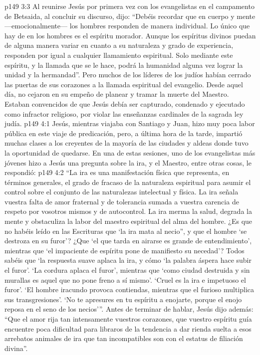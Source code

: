 \vs p149 3:3 Al reunirse Jesús por primera vez con los evangelistas en el campamento de Betsaida, al concluir su discurso, dijo: “Debéis recordar que en cuerpo y mente ---emocionalmente--- los hombres responden de manera individual. Lo único que hay de  en los hombres es el espíritu morador. Aunque los espíritus divinos puedan de alguna manera variar en cuanto a su naturaleza y grado de experiencia, responden por igual a cualquier llamamiento espiritual. Solo mediante este espíritu, y la llamada que se le hace, podrá la humanidad alguna vez lograr la unidad y la hermandad”. Pero muchos de los líderes de los judíos habían cerrado las puertas de sus corazones a la llamada espiritual del evangelio. Desde aquel día, no cejaron en su empeño de planear y tramar la muerte del Maestro. Estaban convencidos de que Jesús debía ser capturado, condenado y ejecutado como infractor religioso, por violar las enseñanzas cardinales de la sagrada ley judía.
\vs p149 4:1 Jesús, mientras viajaba con Santiago y Juan, hizo muy poca labor pública en este viaje de predicación, pero, a última hora de la tarde, impartió muchas clases a los creyentes de la mayoría de las ciudades y aldeas donde tuvo la oportunidad de quedarse. En una de estas sesiones, uno de los evangelistas más jóvenes hizo a Jesús una pregunta sobre la ira, y el Maestro, entre otras cosas, le respondió:
\vs p149 4:2 \pc “La ira es una manifestación física que representa, en términos generales, el grado de fracaso de la naturaleza espiritual para asumir el control sobre el conjunto de las naturalezas intelectual y física. La ira señala vuestra falta de amor fraternal y de tolerancia sumada a vuestra carencia de respeto por vosotros mismos y de autocontrol. La ira merma la salud, degrada la mente y obstaculiza la labor del maestro espiritual del alma del hombre. ¿Es que no habéis leído en las Escrituras que ‘la ira mata al necio”, y que el hombre ‘se destroza en su furor’? ¿Que ‘el que tarda en airarse es grande de entendimiento’, mientras que ‘el impaciente de espíritu pone de manifiesto su necedad’? Todos sabéis que ‘la respuesta suave aplaca la ira, y cómo ‘la palabra áspera hace subir el furor’. ‘La cordura aplaca el furor’, mientras que ‘como ciudad destruida y sin murallas es aquel que no pone freno a sí mismo’. ‘Cruel es la ira e impetuoso el furor’. ‘El hombre iracundo provoca contiendas, mientras que el furioso multiplica sus transgresiones’. ‘No te apresures en tu espíritu a enojarte, porque el enojo reposa en el seno de los necios’”. Antes de terminar de hablar, Jesús dijo además: “Que el amor rija tan intensamente vuestros corazones, que vuestro espíritu guía encuentre poca dificultad para libraros de la tendencia a dar rienda suelta a esos arrebatos animales de ira que tan incompatibles son con el estatus de filiación divina”.
